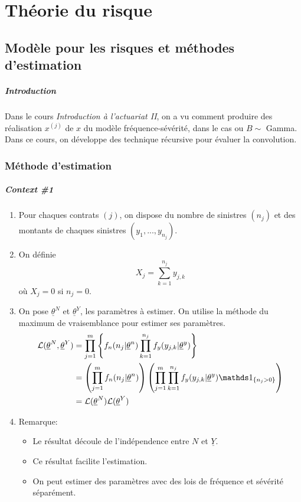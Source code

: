 \chapter{Théorie du risque}


\section{Modèle pour les risques et méthodes d'estimation}
\paragraph{Introduction} 
Dans le cours \emph{Introduction à l'actuariat II}, on a vu comment produire des réalisation $x^{(j)}$ de $x$ du modèle fréquence-sévérité, dans le cas ou $B\sim$ Gamma. Dans ce cours, on développe des technique récursive pour évaluer la convolution.

\subsection{Méthode d'estimation}

\paragraph{Context \#1}
\begin{enumerate}[label=(\arabic*)]
    \item Pour chaques contrats $(j)$, on dispose du nombre de sinistres $(n_j)$ et des montants de chaques sinistres $(y_1,...,y_{n_j})$.
    \item On définie \[ X_j = \sum_{k=1}^{n_j} y_{j,k} \] où $X_j = 0$ si $n_j = 0$.
    \item On pose $\underline{\theta}^N$ et $\underline{\theta}^Y$, les paramètres à estimer. On utilise la méthode du maximum de vraisemblance pour estimer ses paramètres. 
        \begin{align*}
            \mathcal{L}(\underline{\theta}^N,\underline{\theta}^Y) &= \prod_{j=1}^m \left\{ f_n(n_j|\underline{\theta}^n) \prod_{k=1}^{n_j} f_y(y_{j,k}|\underline{\theta}^y) \right\} \\
            &= \left( \prod_{j=1}^m f_n(n_j|\underline{\theta}^n) \right) \left( \prod_{j=1}^m \prod_{k=1}^{n_j} f_y(y_{j,k}|\underline{\theta}^y) \indic{n_j>0} \right) \\
            &= \mathcal{L}(\underline{\theta}^N)\mathcal{L}(\underline{\theta}^Y)
        \end{align*}
    \item Remarque:
    \begin{itemize}
        \item Le résultat découle de l'indépendence entre $N$ et $\underline{Y}$.
        \item Ce résultat facilite l'estimation.
        \item On peut estimer des paramètres avec des lois de fréquence et sévérité séparément.
    \end{itemize}
\end{enumerate}

